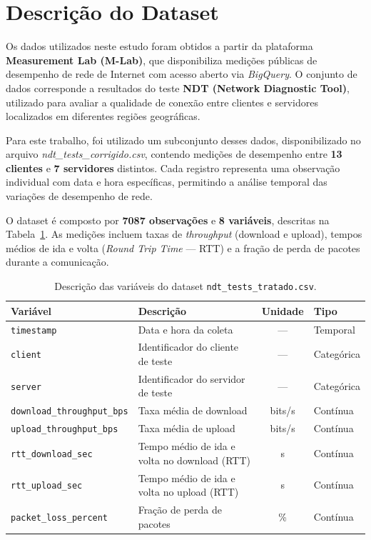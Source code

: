 \documentclass{article}
\begin{document}
\section{Descrição do Dataset}

Os dados utilizados neste estudo foram obtidos a partir da plataforma
\textbf{Measurement Lab (M-Lab)}, que disponibiliza medições públicas de desempenho
de rede de Internet com acesso aberto via \textit{BigQuery}.
O conjunto de dados corresponde a resultados do teste
\textbf{NDT (Network Diagnostic Tool)}, utilizado para avaliar a qualidade de conexão
entre clientes e servidores localizados em diferentes regiões geográficas.

Para este trabalho, foi utilizado um subconjunto desses dados, disponibilizado no
arquivo \textit{ndt\_tests\_corrigido.csv}, contendo medições de desempenho entre
\textbf{13 clientes} e \textbf{7 servidores} distintos. Cada registro representa uma
observação individual com data e hora específicas, permitindo a análise temporal
das variações de desempenho de rede.

O dataset é composto por \textbf{7087 observações} e \textbf{8 variáveis},
descritas na Tabela~\ref{tab:variables}. As medições incluem taxas de
\textit{throughput} (download e upload), tempos médios de ida e volta
(\textit{Round Trip Time} — RTT) e a fração de perda de pacotes durante a comunicação.

\begin{table}[htp]
	\centering
	\caption{Descrição das variáveis do dataset \texttt{ndt\_tests\_tratado.csv}.}
	\label{tab:variables}
	\begin{tabular}{llcl}
		\hline
		\textbf{Variável} & \textbf{Descrição} & \textbf{Unidade} & \textbf{Tipo} \\ \hline
		\texttt{timestamp} & Data e hora da coleta & --- & Temporal \\
		\texttt{client} & Identificador do cliente de teste & --- & Categórica \\
		\texttt{server} & Identificador do servidor de teste & --- & Categórica \\
		\texttt{download\_throughput\_bps} & Taxa média de download & bits/s & Contínua \\
		\texttt{upload\_throughput\_bps} & Taxa média de upload & bits/s & Contínua \\
		\texttt{rtt\_download\_sec} & Tempo médio de ida e volta no download (RTT) & s & Contínua \\
		\texttt{rtt\_upload\_sec} & Tempo médio de ida e volta no upload (RTT) & s & Contínua \\
		\texttt{packet\_loss\_percent} & Fração de perda de pacotes & \% & Contínua \\ \hline
	\end{tabular}
\end{table}
\end{document}
